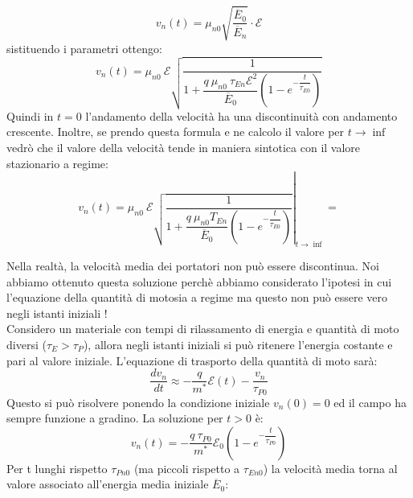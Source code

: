 %
\begin{equation}
     v_n(t)=\mu_{n0} \sqrt{\dfrac{\overline{E}_0}{\overline{E}_n}}\cdot \mathcal{E}
\end{equation}
%
sistituendo i parametri ottengo:
%
\begin{equation}
    v_n(t)=\mu_{n0}\ \mathcal{E}\sqrt{\dfrac{1}{1+\dfrac{q\ \mu_{n0}\ \tau_{En} \mathcal{E}^2}{\overline{E}_0}\left( 1-e^{-\dfrac{t}{\tau_{E0}}}\right)}}
\end{equation}
%
Quindi in $t=0$ l'andamento della velocità ha una discontinuità con andamento crescente.
Inoltre, se prendo questa formula e ne calcolo il valore per $t \rightarrow \inf$ vedrò che il valore della velocità tende in maniera sintotica con il valore stazionario a regime:
%
\begin{equation}
    v_n(t)=\left.\mu_{n0}\ \mathcal{E}\sqrt{\dfrac{1}{1+\dfrac{q\ \mu_{n0}T_{En}}{\overline{E}_0}\left( 1-e^{-\dfrac{t}{\tau_{E0}}}\right)}}\right|_{t \rightarrow \inf}=
\end{equation}
%

Nella realtà, la velocità media dei portatori non può essere discontinua. Noi abbiamo ottenuto questa soluzione perchè abbiamo considerato l'ipotesi in cui l'equazione della quantità di motosia a regime ma questo non può essere vero negli istanti iniziali !\\
Considero un materiale con tempi di rilassamento di energia e quantità di moto diversi ($\tau_E > \tau_P$), allora negli istanti iniziali si può ritenere l'energia costante e pari al valore iniziale.
L'equazione di trasporto della quantità di moto sarà:
%
\begin{equation}
    \dfrac{dv_n}{dt} \approx -\dfrac{q}{m^*}\mathcal{E}(t)-\dfrac{v_n}{\tau_{P0}}
\end{equation}
%
Questo si può risolvere ponendo la condizione iniziale $v_n(0)=0$ ed il campo ha sempre funzione a gradino.
La soluzione per $t>0$ è:
%
\begin{equation}
    v_n(t)=-\dfrac{q\ \tau_{P0}}{m^*}\mathcal{E}_0 \left( 1-e^{-\dfrac{t}{\tau_{P0}}}\right)
\end{equation}
%
Per t lunghi rispetto $\tau_{Pn0}$ (ma piccoli rispetto a $\tau_{En0}$) la velocità media torna al valore associato all'energia media iniziale $\overline{E}_0$:

